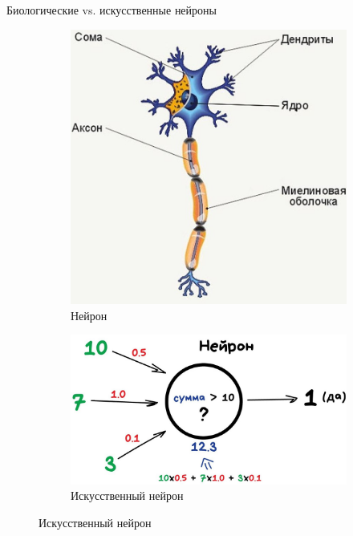 \documentclass[aspectratio=169]{beamer}
\begin{document}
\begin{frame}{Биологические vs. искусственные нейроны}
    \begin{figure}
        \begin{subfigure}[b]{.35\linewidth}
            \centering
            \includegraphics[width=\linewidth]{graphs/fig9.jpg}
            \caption*{Нейрон}
        \end{subfigure}
        \begin{subfigure}[b]{.64\linewidth}
            \centering
            \includegraphics[width=\linewidth]{graphs/fig10.jpg}
            \caption*{Искусственный нейрон}
        \end{subfigure}
    \end{figure}
\end{frame}
\end{document}

